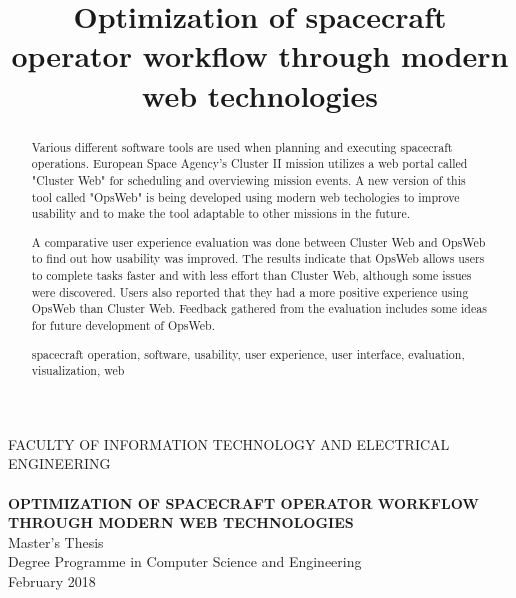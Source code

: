 \documentclass[a4paper, 12pt,titlepage]{dithesis}
\title{Optimization of spacecraft operator workflow through modern web technologies}
\begin{document}
\begin{titlepage}
	{\sffamily\fontsize{9}{1pt}\selectfont FACULTY OF INFORMATION TECHNOLOGY AND ELECTRICAL ENGINEERING\\}
	\vspace{65 mm}
	{\textbf{\fontsize{16}{19pt}\selectfont \getfirstname\ \getlastname }\\}
	\vspace{15 mm}
	{\textbf{\fontsize{18}{22pt}\selectfont OPTIMIZATION OF SPACECRAFT OPERATOR WORKFLOW THROUGH MODERN WEB TECHNOLOGIES\\}}
	\vspace{53 mm}
	{\fontsize{14}{17}\selectfont Master's Thesis \\Degree Programme in Computer Science and Engineering \\ February 2018\\}
\end{titlepage}


\begin{abstract}
Various different software tools are used when planning and executing spacecraft operations. European Space Agency's Cluster II mission utilizes a web portal called "Cluster Web" for scheduling and overviewing mission events. A new version of this tool called "OpsWeb" is being developed using modern web techologies to improve usability and to make the tool adaptable to other missions in the future. 

A comparative user experience evaluation was done between Cluster Web and OpsWeb to find out how usability was improved. The results indicate that OpsWeb allows users to complete tasks faster and with less effort than Cluster Web, although some issues were discovered. Users also reported that they had a more positive experience using OpsWeb than Cluster Web. Feedback gathered from the evaluation includes some ideas for future development of OpsWeb.

\keywords spacecraft operation, software, usability, user experience, user interface, evaluation, visualization, web

\end{abstract}
\end{document}
